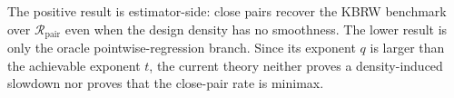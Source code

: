 The positive result is estimator-side: close pairs recover the KBRW benchmark over \(\mathcal R_{\mathrm{pair}}\) even when the design density has no smoothness.  The lower result is only the oracle pointwise-regression branch.  Since its exponent \(q\) is larger than the achievable exponent \(t\), the current theory neither proves a density-induced slowdown nor proves that the close-pair rate is minimax.